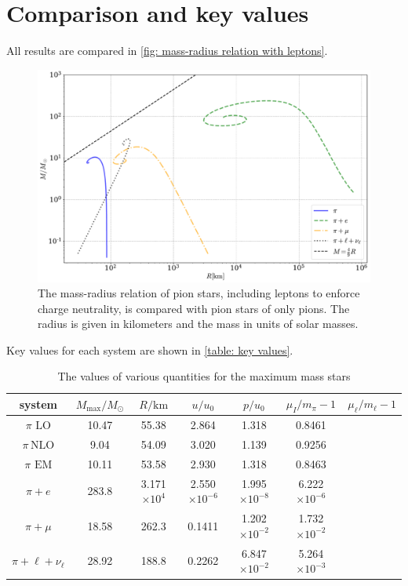 \section{Comparison and key values}



All results are compared in \autoref{fig: mass-radius relation with leptons}.

\begin{figure}[!htb]
    \centering
    \includegraphics[width=\textwidth]{../scripts/figurer/pion_star/mass_radius_all.pdf}
    \caption{
        The mass-radius relation of pion stars, including leptons to enforce charge neutrality, is compared with pion stars of only pions.
        The radius is given in kilometers and the mass in units of solar masses.
        }
        \label{fig: mass-radius relation with leptons}
\end{figure}


Key values for each system are shown in \autoref{table: key values}.


\begin{table}[!htb]
    \centering
    \caption{The values of various quantities for the maximum mass stars}
    \label{table: key values}
    \begin{tabular}{c  c  c  c  c c c}
        \hline \hline
        system & $M_\text{max}/M_\odot$ & $R / \text{km}$ & 
        $u/u_0$ & $p/u_0$ & $\mu_I/m_\pi-1$ & $\mu_\ell/m_\ell-1$ \\
        \hline
        $\pi\,\, \text{LO}$& 10.47 & 55.38 & 2.864 & 1.318 & 0.8461& \\
        $\pi\, \text{NLO}$& 9.04 & 54.09 & 3.020 & 1.139 & 0.9256 & \\
        $\pi\,\,\text{EM}$& 10.11 & 53.58 & 2.930 & 1.318 & 0.8463 & \\
        $\pi + e$& 283.8 & 3.171$\times10^4$ & 
        2.550$\times10^{-6}$ & 1.995$\times10^{-8}$ & 
        6.222$\times10^{-6}$ & \\
        $\pi + \mu$& 18.58 & 262.3 & 
        0.1411 & 1.202$\times 10^{-2}$ &
        1.732$\times10^{-2}$& \\
        $\pi + \ell + \nu_\ell$& 28.92 & 188.8 &
        0.2262  & 6.847$\times 10^{-2}$ &
        5.264$\times10^{-3}$& \\
        \hline
    \end{tabular}
\end{table}



